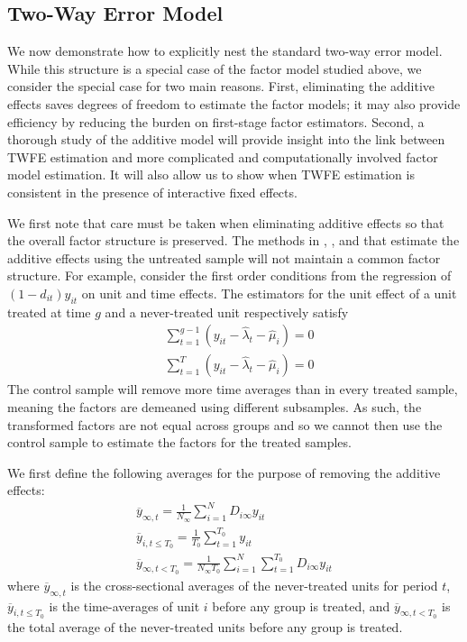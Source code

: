 \subsection{Two-Way Error Model}

We now demonstrate how to explicitly nest the standard two-way error model. While this structure is a special case of the factor model studied above, we consider the special case for two main reasons. First, eliminating the additive effects saves degrees of freedom to estimate the factor models; it may also provide efficiency by reducing the burden on first-stage factor estimators. Second, a thorough study of the additive model will provide insight into the link between TWFE estimation and more complicated and computationally involved factor model estimation. It will also allow us to show when TWFE estimation is consistent in the presence of interactive fixed effects. 

We first note that care must be taken when eliminating additive effects so that the overall factor structure is preserved. The methods in \citet{Borusyak_Jaravel_Spiess_2021}, \citet{Gardner_2021}, and \cite{Wooldridge_2021} that estimate the additive effects using the untreated sample will not maintain a common factor structure. For example, consider the first order conditions from the regression of $(1 - d_{it})y_{it}$ on unit and time effects. The estimators for the unit effect of a unit treated at time $g$ and a never-treated unit respectively satisfy
\begin{align}
  &\sum_{t = 1}^{g-1} (y_{it} - \widehat{\lambda}_t - \widehat{\mu}_i) = 0\\
  &\sum_{t = 1}^T (y_{it} - \widehat{\lambda}_t - \widehat{\mu}_i) = 0
\end{align}
The control sample will remove more time averages than in every treated sample, meaning the factors are demeaned using different subsamples. As such, the transformed factors are not equal across groups and so we cannot then use the control sample to estimate the factors for the treated samples. 

We first define the following averages for the purpose of removing the additive effects:
\begin{gather}
  \overline{y}_{\infty , t} = \frac{1}{N_{\infty}} \sum_{i = 1}^N D_{i \infty} y_{it} \\
  \overline{y}_{i,t\leq T_0} = \frac{1}{T_0} \sum_{t = 1}^{T_0} y_{it} \\
  \overline{y}_{\infty, t < T_0} = \frac{1}{N_{\infty} T_0} \sum_{i = 1}^N \sum_{t = 1}^{T_0} D_{i \infty} y_{it}
\end{gather}
where $\overline{y}_{\infty , t}$ is the cross-sectional averages of the never-treated units for period $t$, $\overline{y}_{i,t\leq T_0}$ is the time-averages of unit $i$ before any group is treated, and $\overline{y}_{\infty, t < T_0}$ is the total average of the never-treated units before any group is treated.

